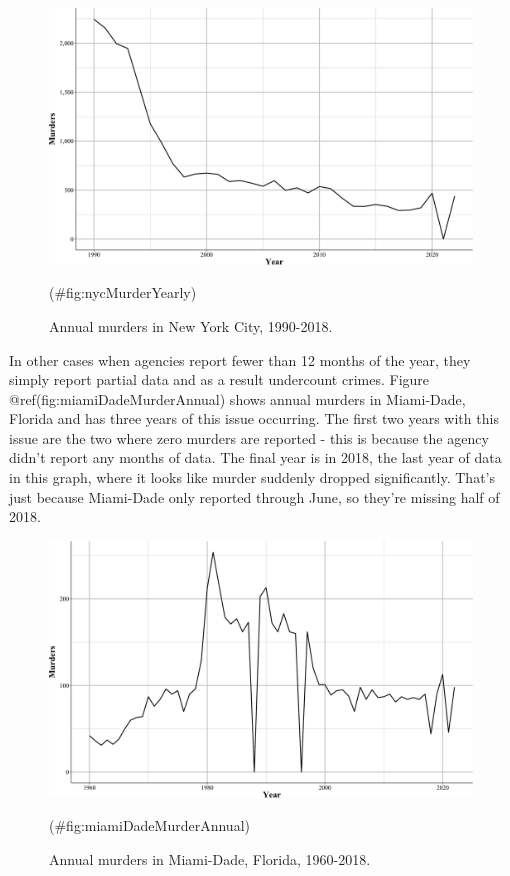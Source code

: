\documentclass[
  12pt,
  openany]{book}
\begin{document}
\begin{figure}

{\centering \includegraphics[width=0.9\linewidth]{ucrbook_files/figure-latex/nycMurderYearly-1} 

}

\caption{Annual murders in New York City, 1990-2018.}(\#fig:nycMurderYearly)
\end{figure}

In other cases when agencies report fewer than 12 months of the year, they simply report partial data and as a result undercount crimes. Figure @ref(fig:miamiDadeMurderAnnual) shows annual murders in Miami-Dade, Florida and has three years of this issue occurring. The first two years with this issue are the two where zero murders are reported - this is because the agency didn't report any months of data. The final year is in 2018, the last year of data in this graph, where it looks like murder suddenly dropped significantly. That's just because Miami-Dade only reported through June, so they're missing half of 2018.

\begin{figure}

{\centering \includegraphics[width=0.9\linewidth]{ucrbook_files/figure-latex/miamiDadeMurderAnnual-1} 

}

\caption{Annual murders in Miami-Dade, Florida, 1960-2018.}(\#fig:miamiDadeMurderAnnual)
\end{figure}
\end{document}
